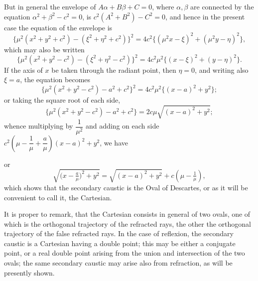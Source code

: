 \documentclass[11pt]{article}
\begin{document}
But in general the envelope of $A\alpha + B\beta + C = 0$, where $\alpha,\beta$ are connected by the equation $\alpha^2 + \beta^2 - c^2 = 0$, is $c^2(A^2 + B^2) - C^2 = 0$, and hence in the present case the equation of the envelope is
\[
\{\mu^2(x^2 + y^2 + c^2) - (\xi^2 + \eta^2 + c^2)\}^2 = 4 c^2\{(\mu^2 x - \xi)^2 + (\mu^2 y - \eta)^2\},
\]
which may also be written
\[
\{\mu^2(x^2 + y^2 - c^2) - (\xi^2 + \eta^2 - c^2)\}^2 = 4 c^2 \mu^2\{(x - \xi)^2 + (y - \eta)^2\}.
\]
If the axis of $x$ be taken through the radiant point, then $\eta = 0$, and writing also $\xi = a$, the equation becomes
\[
\{\mu^2(x^2 + y^2 - c^2) - a^2 + c^2\}^2 = 4 c^2 \mu^2\{(x - a)^2 + y^2\};
\]
or taking the square root of each side,
\[
\{\mu^2(x^2 + y^2 - c^2) - a^2 + c^2\} = 2 c \mu \sqrt{(x - a)^2 + y^2};
\]
whence multiplying by $\dfrac{1}{\mu^2}$ and adding on each side $c^2\!\left(\mu - \dfrac{1}{\mu} + \dfrac{a}{\mu}\right)(x - a)^2 + y^2$, we have

\medskip

\noindent or
\[
\sqrt{\bigl(x - \tfrac{a}{\mu}\bigr)^2 + y^2} = \sqrt{(x - a)^2 + y^2} + c\!\left(\mu - \tfrac{1}{\mu}\right),
\]
which shows that the secondary caustic is the Oval of Descartes, or as it will be convenient to call it, the Cartesian.

\newpage

It is proper to remark, that the Cartesian consists in general of two ovals, one of which is the orthogonal trajectory of the refracted rays, the other the orthogonal trajectory of the false refracted rays. In the case of reflexion, the secondary caustic is a Cartesian having a double point; this may be either a conjugate point, or a real double point arising from the union and intersection of the two ovals; the same secondary caustic may arise also from refraction, as will be presently shown.
\end{document}
